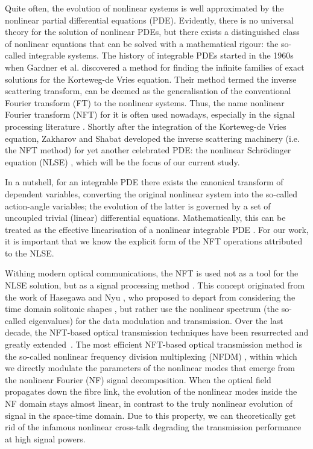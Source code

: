 Quite often, the evolution of nonlinear systems is well approximated by the nonlinear partial differential equations (PDE). Evidently, there is no universal theory for the solution of nonlinear PDEs, but there exists a distinguished class of nonlinear equations that can be solved with a mathematical rigour: the so-called integrable systems. The history of integrable PDEs started in the 1960s when Gardner et al. \cite{ggk67} discovered a method for finding the infinite families of exact solutions for the  Korteweg-de Vries equation. Their method termed the inverse scattering transform, can be deemed as the generalisation of the conventional Fourier transform (FT) to the nonlinear systems. Thus, the name nonlinear Fourier transform (NFT) for it is often used nowadays, especially in the signal processing literature \cite{yk14-1,tplwfkd17}. Shortly after the integration of the Korteweg-de Vries equation, Zakharov and Shabat developed the inverse scattering machinery (i.e. the NFT method) for yet another celebrated PDE: the nonlinear Schr\"odinger equation (NLSE) \cite{zs72}, which will be the focus of our current study.  

In a nutshell, for an integrable PDE there exists the canonical transform of dependent variables, converting the original nonlinear system into the so-called action-angle variables; the evolution of the latter is governed by a set of uncoupled trivial (linear) differential equations. Mathematically, this can be treated as the effective linearisation of a nonlinear integrable PDE \cite{akn74,nmp84}. For our work, it is important that we know the explicit form of the NFT operations attributed to the NLSE.

Withing modern optical communications, the NFT is used not as a tool for the NLSE solution, but as a signal processing method \cite{tplwfkd17,yk14-1}. This concept originated from the work of Hasegawa and Nyu \cite{hn93}, who proposed to depart from considering the time domain solitonic shapes \cite{mg06}, but rather use the nonlinear spectrum (the so-called eigenvalues) for the data modulation and transmission. Over the last decade, the NFT-based optical transmission techniques have been resurrected and greatly extended~\cite{tplwfkd17,yal19}. The most efficient NFT-based optical transmission method is the so-called nonlinear frequency division multiplexing (NFDM) \cite{yk14-1}, within which we directly modulate the parameters of the nonlinear modes that emerge from the nonlinear Fourier (NF) signal decomposition. When the optical field propagates down the fibre link, the evolution of the nonlinear modes inside the NF domain stays almost linear, in contrast to the truly nonlinear evolution of signal in the space-time domain. Due to this property, we can theoretically get rid of the infamous nonlinear cross-talk degrading the transmission performance at high signal powers\cite{ekw10}. 

